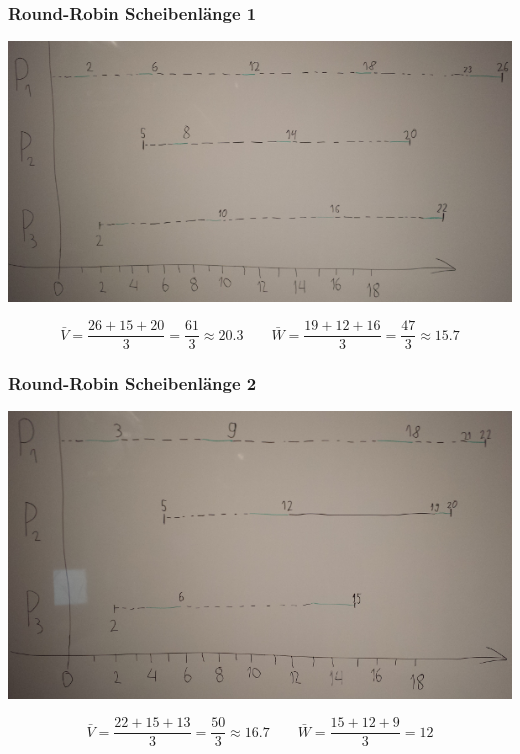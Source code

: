 \documentclass[10pt,a4paper]{article}
\begin{document}
\subsubsection*{Round-Robin Scheibenlänge 1}

\includegraphics[width=\textwidth]{sheet-7/exercise-2-3-3}

\begin{equation*}
  \bar{V} = \frac{26 + 15 + 20}{3} = \frac{61}{3} \approx 20.3 \qquad \bar{W} = \frac{19 + 12 + 16}{3} = \frac{47}{3} \approx 15.7
\end{equation*}

\subsubsection*{Round-Robin Scheibenlänge 2}

\includegraphics[width=\textwidth]{sheet-7/exercise-2-3-4}

\begin{equation*}
  \bar{V} = \frac{22 + 15 + 13}{3} = \frac{50}{3} \approx 16.7 \qquad \bar{W} = \frac{15 + 12 + 9}{3} = 12
\end{equation*}
\end{document}
